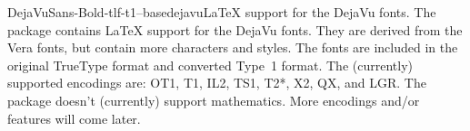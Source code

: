 \documentclass{ddltxtyp}
\begin{document}


\begin{package}{DejaVuSans-Bold-tlf-t1--base}{dejavu}{{\LaTeX} support for the DejaVu fonts.}
The package contains {\LaTeX} support for the DejaVu fonts. They
are derived from the Vera fonts, but contain more characters
and styles. The fonts are included in the original TrueType
format and converted Type~1 format. The (currently) supported
encodings are: OT1, T1, IL2, TS1, T2*, X2, QX, and LGR. The
package doesn't (currently) support mathematics. More encodings
and/or features will come later.
\end{package}

\end{document}
